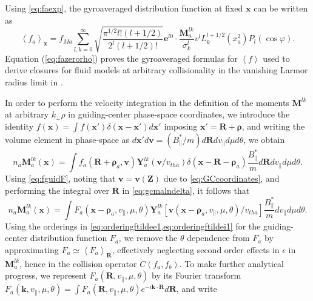%
Using \cref{eq:faexp}, the gyroaveraged distribution function at fixed $\mathbf x$ can be written as
%
\begin{equation}
    \left<f_a\right>_{\mathbf x} = f_{Ma}\sum_{l,k=0}^{\infty} \sqrt{\frac{\pi^{1/2}l!(l+1/2)}{2^{l}(l+1/2)!}}\mathbf e^{l0} \cdot \frac{\mathbf M_a^{lk}}{\sigma_k^l} v^l L_k^{l+1/2}(x_a^2)  P_l(\cos \varphi).
\label{eq:fazerorho}
\end{equation}
%
Equation (\ref{eq:fazerorho}) proves the gyroaveraged formulas for $\left< f \right>$ used to derive closures for fluid models at arbitrary collisionality in the vanishing Larmor radius limit in \citet{Ji2009a,Ji2013a,Ji2014a}.

In order to perform the velocity integration in the definition of the moments $\mathbf M^{lk}$ at arbitrary $k_\perp \rho$ in guiding-center phase-space coordinates, we introduce the identity $f(\mathbf x) = \int f(\mathbf x')\delta(\mathbf x-\mathbf x')d\mathbf x'$ imposing $\mathbf x' = \mathbf R+\mathbf \rho$, and writing the volume element in phase-space as $d\mathbf x'd\mathbf v = (B_\parallel^*/m)d\mathbf R dv_\parallel d\mu d\theta$, we obtain
%
\begin{equation}
    n_a \mathbf M_a^{lk}(\mathbf x)= \int f_a(\mathbf R + \mathbf \rho_a, \mathbf v) \mathbf Y_a^{lk}(\mathbf v/v_{tha}) \delta(\mathbf x - \mathbf R - \mathbf \rho_a) \frac{B_{\parallel}^*}{m}d\mathbf R dv_\parallel d\mu d\theta.
\label{eq:gcmalndelta}
\end{equation}
%
Using \cref{eq:fguidF}, noting that $\mathbf v = \mathbf v(\mathbf Z)$ due to \cref{eq:GCcoordinates}, and performing the integral over $\mathbf R$ in \cref{eq:gcmalndelta}, it follows that
%
\begin{equation}
    n_a \mathbf M_a^{lk}(\mathbf x)= \int F_a(\mathbf x-{\mathbf \rho}_a, v_\parallel, \mu,\theta) \mathbf Y_a^{lk}[\mathbf v(\mathbf x-{\mathbf \rho}_a, v_\parallel, \mu, \theta)/v_{tha}] \frac{B_{\parallel}^*}{m}dv_\parallel d\mu d\theta.
\label{eq:gcmalnnodelta}
\end{equation}
%
Using the orderings in \cref{eq:orderingftildee1,eq:orderingftildei1} for the guiding-center distribution function $F_a$, we remove the $\theta$ dependence from $F_a$ by approximating $F_a \simeq \left< F_a \right>_{\mathbf R}$, effectively neglecting second order effects in $\epsilon$ in $\mathbf M_a^{lk}$, hence in the collision operator $C(f_a,f_b)$.
%
To make further analytical progress, we represent $F_a(\mathbf R, v_\parallel, \mu, \theta)$ by its Fourier transform $F_a(\mathbf k, v_\parallel, \mu, \theta)=\int F_a(\mathbf R, v_\parallel, \mu, \theta) e^{-i \mathbf k \cdot \mathbf R} d \mathbf R$, and write
